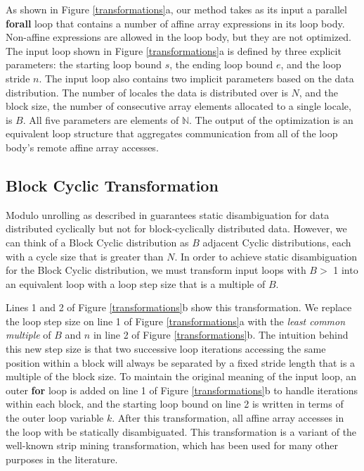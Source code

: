 As shown in Figure \ref{transformations}a, our method takes as its input a parallel \textbf{forall} loop that contains a number of affine array expressions in its loop body. Non-affine expressions are allowed in the loop body, but they are not optimized. The input loop shown in Figure \ref{transformations}a is defined by three explicit parameters: the starting loop bound $s$, the ending loop bound $e$, and the loop stride $n$. The input loop also contains two implicit parameters based on the data distribution. The number of locales the data is distributed over is $N$, and the block size, the number of consecutive array elements allocated to a single locale, is $B$. All five parameters are elements of $\mathbb{N}$. The output of the optimization is an equivalent loop structure that aggregates communication from all of the loop body's remote affine array accesses.

\subsection{Block Cyclic Transformation}\label{subsec:block_cyclic_transformation}

Modulo unrolling as described in \cite{barua1999maps} guarantees static disambiguation for data distributed cyclically but not for block-cyclically distributed data. However, we can think of a Block Cyclic distribution as $B$ adjacent Cyclic distributions, each with a cycle size that is greater than $N$. In order to achieve static disambiguation for the Block Cyclic distribution, we must transform input loops with $B >$ 1 into an equivalent loop with a loop step size that is a multiple of $B$. 

Lines 1 and 2 of Figure \ref{transformations}b show this transformation. We replace the loop step size on line 1 of Figure \ref{transformations}a with the \textit{least common multiple} of $B$ and $n$ in line 2 of Figure \ref{transformations}b. The intuition behind this new step size is that two successive loop iterations accessing the same position within a block will always be separated by a fixed stride length that is a multiple of the block size. To maintain the original meaning of the input loop, an outer \textbf{for} loop is added on line 1 of Figure \ref{transformations}b to handle iterations within each block, and the starting loop bound on line 2 is written in terms of the outer loop variable $k$. After this transformation, all affine array accesses in the loop with be statically disambiguated. This transformation is a variant of the well-known strip mining transformation, which has been used for many other purposes in the literature.

